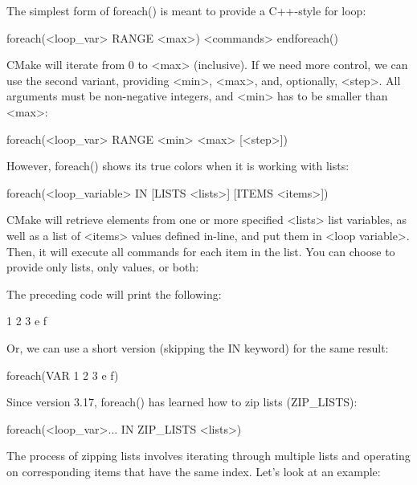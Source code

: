 The simplest form of foreach() is meant to provide a C++-style for loop:

\begin{shell}
foreach(<loop_var> RANGE <max>)
    <commands>
endforeach()
\end{shell}

CMake will iterate from 0 to <max> (inclusive). If we need more control, we can use the second variant, providing <min>, <max>, and, optionally, <step>. All arguments must be non-negative integers, and <min> has to be smaller than <max>:

\begin{shell}
foreach(<loop_var> RANGE <min> <max> [<step>])
\end{shell}

However, foreach() shows its true colors when it is working with lists:

\begin{shell}
foreach(<loop_variable> IN [LISTS <lists>] [ITEMS <items>])
\end{shell}

CMake will retrieve elements from one or more specified <lists> list variables, as well as a list of <items> values defined in-line, and put them in <loop variable>. Then, it will execute all commands for each item in the list. You can choose to provide only lists, only values, or both:



The preceding code will print the following:

\begin{shell}
1
2
3
e
f
\end{shell}

Or, we can use a short version (skipping the IN keyword) for the same result:

\begin{cmake}
foreach(VAR 1 2 3 e f)
\end{cmake}

Since version 3.17, foreach() has learned how to zip lists (ZIP\_LISTS):

\begin{shell}
foreach(<loop_var>... IN ZIP_LISTS <lists>)
\end{shell}

The process of zipping lists involves iterating through multiple lists and operating on corresponding items that have the same index. Let’s look at an example:

